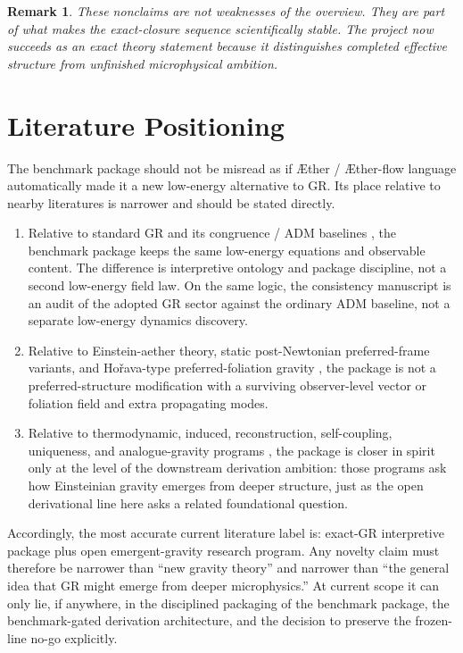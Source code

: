 \documentclass[11pt]{article}
\newcommand{\Aether}{\AE{}ther}
\newcommand{\Aflow}{\AE{}ther-flow}
\newtheorem{remark}{Remark}
\begin{document}
\begin{remark}
These nonclaims are not weaknesses of the overview. They are part of what makes the exact-closure sequence scientifically stable. The project now succeeds as an exact theory statement because it distinguishes completed effective structure from unfinished microphysical ambition.
\end{remark}

\section{Literature Positioning}

The benchmark package should not be misread as if \Aether{} / \Aflow{} language automatically made it a new low-energy alternative to GR. Its place relative to nearby literatures is narrower and should be stated directly.
\begin{enumerate}
    \item Relative to standard GR and its congruence / ADM baselines \cite{Einstein1916,Raychaudhuri1955,EllisVanElst1999,ADM1962}, the benchmark package keeps the same low-energy equations and observable content. The difference is interpretive ontology and package discipline, not a second low-energy field law. On the same logic, the consistency manuscript is an audit of the adopted GR sector against the ordinary ADM baseline, not a separate low-energy dynamics discovery.
    \item Relative to Einstein-aether theory, static post-Newtonian preferred-frame variants, and Ho\v{r}ava-type preferred-foliation gravity \cite{JacobsonMattingly2001,JacobsonMattingly2004,ElingJacobson2004,Jacobson2010,Jacobson2014,JacobsonSperanza2015,Horava2009}, the package is not a preferred-structure modification with a surviving observer-level vector or foliation field and extra propagating modes.
    \item Relative to thermodynamic, induced, reconstruction, self-coupling, uniqueness, and analogue-gravity programs \cite{Jacobson1995,Visser2002,HojmanKucharTeitelboim1976,Deser2004,Lovelock1971,BarceloLiberatiVisser2011,Sakharov1967}, the package is closer in spirit only at the level of the downstream derivation ambition: those programs ask how Einsteinian gravity emerges from deeper structure, just as the open derivational line here asks a related foundational question.
\end{enumerate}

Accordingly, the most accurate current literature label is: exact-GR interpretive package plus open emergent-gravity research program. Any novelty claim must therefore be narrower than ``new gravity theory'' and narrower than ``the general idea that GR might emerge from deeper microphysics.'' At current scope it can only lie, if anywhere, in the disciplined packaging of the benchmark package, the benchmark-gated derivation architecture, and the decision to preserve the frozen-line no-go explicitly.
\end{document}

